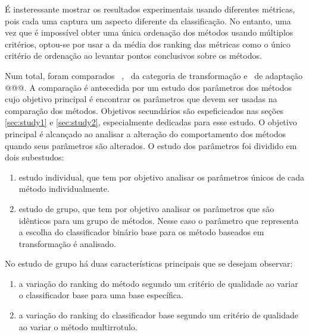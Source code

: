 É insteressante mostrar os resultados experimentais usando diferentes métricas, pois cada uma captura
um aspecto diferente da classificação.
No entanto, uma vez que é impossível obter uma única ordenação dos métodos
usando múltiplos critérios,
optou-se por usar a da média dos ranking das métricas como
o único critério de ordenação ao levantar pontos conclusivos sobre os métodos. 

Num total, foram comparados \Nml~\MML, \NmlT~da categoria de transformação e \NmlA~de adaptação @@@.
A comparação é antecedida por um estudo dos parâmetros dos métodos
cujo objetivo principal é encontrar os parâmetros que devem ser usadas na comparação dos métodos. Objetivos secundários são
espeficicados nas seções \ref{sec:study1} e \ref{sec:study2}, especialmente dedicadas para esse estudo.
O objetivo principal é alcançado ao analisar a alteração do comportamento dos métodos quando seus parâmetros são alterados.
O estudo dos parâmetros foi dividido em dois subestudos:
\begin{enumerate}
 \item estudo individual, que tem por objetivo analisar os parâmetros únicos de cada método individualmente.
  \item estudo de grupo, que tem por objetivo analisar os parâmetros que são idênticos para um grupo de métodos.
  Nesse caso o parâmetro que representa a escolha do classificador binário base para os método baseados em transformação é
  analisado. 
\end{enumerate}
 No estudo de grupo há duas características principais que se desejam observar:
  
  \begin{enumerate}
  
  \item a variação do ranking do método segundo um critério de qualidade ao variar o classificador base
  para uma base específica.
  \item a variação do ranking do classificador base segundo um critério de qualidade ao variar o método multirrotulo.
  \end{enumerate}

